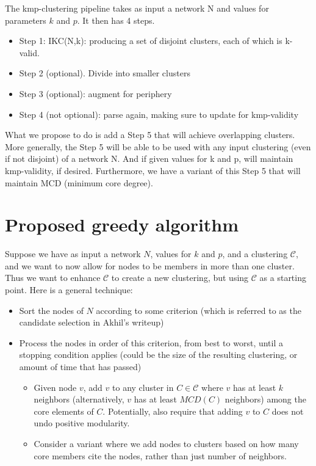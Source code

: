 \documentclass{article}
\begin{document}
The kmp-clustering pipeline takes as input a network N and values for parameters $k$ and $p$. It then has 4 steps.
\begin{itemize}
\item Step 1: IKC(N,k): producing a set of disjoint clusters, each of which is k-valid.
\item Step 2 (optional). Divide into smaller clusters
\item Step 3 (optional): augment for periphery
\item Step 4 (not optional): parse again, making sure to update for kmp-validity
\end{itemize}

What we propose to do is add a Step 5 that will achieve overlapping clusters. More generally, the Step 5 will be able to be used with
any input clustering (even if not disjoint) of a network N. And if given values for k and p, will maintain kmp-validity, if desired.
Furthermore, we have a variant of this Step 5 that will maintain MCD (minimum core degree).


\section{Proposed greedy algorithm}

Suppose we have as input a network $N$, values for $k$ and $p$, and a clustering $\mathcal{C}$, and we want to now allow for nodes to be members in more than one cluster.  Thus we want to enhance $\mathcal{C}$ to create a new clustering, but using $\mathcal{C}$ as a starting point.
Here is a general technique:

\begin{itemize}
\item Sort the nodes of $N$ according to some criterion (which is referred to as the candidate selection in Akhil's writeup)
\item Process the nodes in order of this criterion, from best to worst, until a stopping condition applies (could be the size of the resulting 
clustering, or amount of time that has passed)
\begin{itemize}
\item Given node $v$, add $v$ to any cluster in $C \in \mathcal{C}$ where $v$ has at least $k$ neighbors (alternatively, 
$v$ has at least $MCD(C)$ neighbors) among the core elements of $C$. Potentially, also require that adding $v$ to  $C$ does not
undo positive modularity.
\item Consider a variant where we add nodes to clusters based on how many core members cite the nodes, rather than just number of neighbors.
\end{itemize}
\end{itemize}
\end{document}

